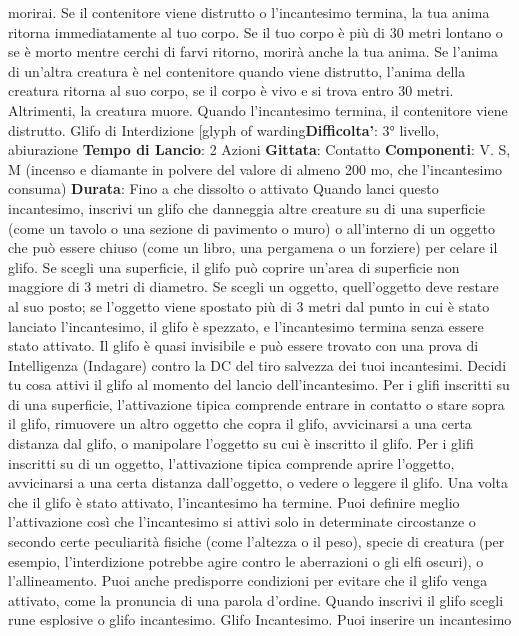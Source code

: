 \begin{multicols}{2}
morirai.
Se il contenitore viene distrutto o l’incantesimo termina,
la tua anima ritorna immediatamente al tuo corpo. Se il
tuo corpo è più di 30 metri lontano o se è morto mentre
cerchi di farvi ritorno, morirà anche la tua anima. Se
l’anima di un’altra creatura è nel contenitore quando
viene distrutto, l’anima della creatura ritorna al suo
corpo, se il corpo è vivo e si trova entro 30 metri.
Altrimenti, la creatura muore.
Quando l’incantesimo termina, il contenitore viene
distrutto.
Glifo di Interdizione
[glyph of warding\textbf{Difficolta'}:
3° livello, abiurazione
\textbf{Tempo di Lancio}: 2 Azioni
\textbf{Gittata}: Contatto
\textbf{Componenti}: V. S, M (incenso e diamante in polvere
del valore di almeno 200 mo, che l’incantesimo
consuma)
\textbf{Durata}: Fino a che dissolto o attivato
Quando lanci questo incantesimo, inscrivi un glifo che
danneggia altre creature su di una superficie (come un
tavolo o una sezione di pavimento o muro) o all’interno
di un oggetto che può essere chiuso (come un libro,
una pergamena o un forziere) per celare il glifo. Se
scegli una superficie, il glifo può coprire un’area di
superficie non maggiore di 3 metri di diametro. Se
scegli un oggetto, quell’oggetto deve restare al suo
posto; se l’oggetto viene spostato più di 3 metri dal
punto in cui è stato lanciato l’incantesimo, il glifo è
spezzato, e l’incantesimo termina senza essere stato
attivato.
Il glifo è quasi invisibile e può essere trovato con una
prova di Intelligenza (Indagare) contro la DC del tiro
salvezza dei tuoi incantesimi.
Decidi tu cosa attivi il glifo al momento del lancio
dell’incantesimo.
Per i glifi inscritti su di una superficie, l’attivazione tipica
comprende entrare in contatto o stare sopra il glifo,
rimuovere un altro oggetto che copra il glifo, avvicinarsi
a una certa distanza dal glifo, o manipolare l’oggetto su
cui è inscritto il glifo.
Per i glifi inscritti su di un oggetto, l’attivazione tipica
comprende aprire l’oggetto, avvicinarsi a una certa
distanza dall’oggetto, o vedere o leggere il glifo. Una
volta che il glifo è stato attivato, l’incantesimo ha
termine.
Puoi definire meglio l’attivazione così che l’incantesimo
si attivi solo in determinate circostanze o secondo certe
peculiarità fisiche (come l’altezza o il peso), specie di
creatura (per esempio, l’interdizione potrebbe agire
contro le aberrazioni o gli elfi oscuri), o l’allineamento.
Puoi anche predisporre condizioni per evitare che il glifo
venga attivato, come la pronuncia di una parola
d’ordine.
Quando inscrivi il glifo scegli rune esplosive o glifo
incantesimo.
Glifo Incantesimo. Puoi inserire un incantesimo

\end{multicols}
